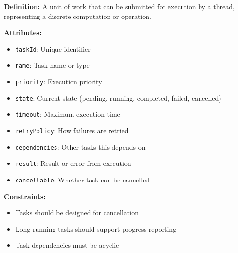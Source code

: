 \documentclass[11pt,letterpaper]{article}
\begin{document}
\begin{definitionbox}
\textbf{Definition:} A unit of work that can be submitted for execution by a thread, representing a discrete computation or operation.

\textbf{Attributes:}
\begin{itemize}[nosep]
    \item \texttt{taskId}: Unique identifier
    \item \texttt{name}: Task name or type
    \item \texttt{priority}: Execution priority
    \item \texttt{state}: Current state (pending, running, completed, failed, cancelled)
    \item \texttt{timeout}: Maximum execution time
    \item \texttt{retryPolicy}: How failures are retried
    \item \texttt{dependencies}: Other tasks this depends on
    \item \texttt{result}: Result or error from execution
    \item \texttt{cancellable}: Whether task can be cancelled
\end{itemize}

\textbf{Constraints:}
\begin{itemize}[nosep]
    \item Tasks should be designed for cancellation
    \item Long-running tasks should support progress reporting
    \item Task dependencies must be acyclic
\end{itemize}
\end{definitionbox}
\end{document}
